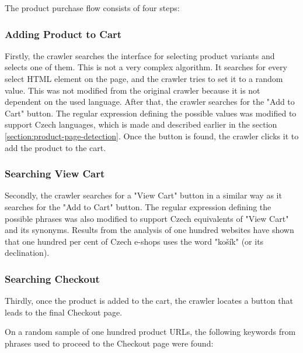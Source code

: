             The product purchase flow consists of four steps:

        \subsubsection{Adding Product to Cart}
            Firstly, the crawler searches the interface for selecting product variants and selects one of them. This is not a very complex algorithm. It searches for every select HTML element on the page, and the crawler tries to set it to a random value. This was not modified from the original crawler because it is not dependent on the used language. After that, the crawler searches for the "Add to Cart" button. The regular expression defining the possible values was modified to support Czech languages, which is made and described earlier in the section \ref{section:product-page-detection}. Once the button is found, the crawler clicks it to add the product to the cart.

        \subsubsection{Searching View Cart}
            Secondly, the crawler searches for a "View Cart" button in a similar way as it searches for the "Add to Cart" button. The regular expression defining the possible phrases was also modified to support Czech equivalents of "View Cart" and its synonyms. Results from the analysis of one hundred websites have shown that one hundred per cent of Czech e-shops uses the word "košík" (or its declination).


        \subsubsection{Searching Checkout}
            Thirdly, once the product is added to the cart, the crawler locates a button that leads to the final Checkout page.

            On a random sample of one hundred product URLs, the following keywords from phrases used to proceed to the Checkout page were found:

